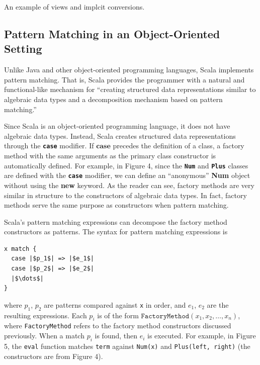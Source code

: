 \documentclass[jou,apacite]{IEEEtran}
\begin{document}
\begin{listing}
  \inputminted[frame=single, firstline=3, lastline=14]{Scala}{../examples/Set.scala}
  \caption{An example of views and implcit conversions.}
  \label{lst:set-example}
\end{listing}

\subsection{Pattern Matching in an Object-Oriented Setting}
Unlike Java and other object-oriented programming languages, Scala implements
pattern matching. That is, Scala provides the programmer with a natural and
functional-like mechanism for ``creating structured data representations similar
to algebraic data types and a decomposition mechanism based on pattern
matching.''

Since Scala is an object-oriented programming language, it does not have
algebraic data types. Instead, Scala creates structured data representations
through the \texttt{\textbf{case}} modifier. If $\textbf{case}$ precedes the
definition of a class, a factory method with the same arguments as the primary
class constructor is automatically defined. For example, in Figure 4, since the
\texttt{\textbf{Num}} and \texttt{\textbf{Plus}} classes are defined with the
\texttt{\textbf{case}} modifier, we can define an “anonymous” \textbf{Num}
object without using the \textbf{new} keyword. As the reader can see, factory
methods are very similar in structure to the constructors of algebraic data
types. In fact, factory methods serve the same purpose as constructors when
pattern matching.

Scala's pattern matching expressions can decompose the factory method
constructors as patterns. The syntax for pattern matching expressions is
\begin{verbatim}
x match { 
  case |$p_1$| => |$e_1$|
  case |$p_2$| => |$e_2$|
  |$\dots$|
}
\end{verbatim}
where $p_1$, $p_2$ are patterns compared against \texttt{x} in order, and $e_1$,
$e_2$ are the resulting expressions. Each $p_i$ is of the form
$\mathtt{FactoryMethod}(x_1, x_2, …, x_n)$, where \texttt{FactoryMethod} refers
to the factory method constructors discussed previously. When a match $p_i$ is
found, then $e_i$ is executed. For example, in Figure 5, the \texttt{eval}
function matches \texttt{term} against \texttt{Num(x)} and \texttt{Plus(left,
  right)} (the constructors are from Figure 4).
\end{document}
